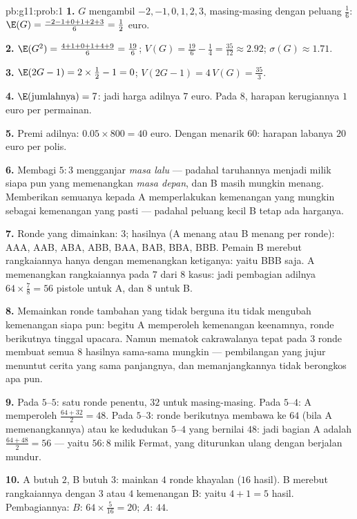 \begin{solution}{pb:g11:prob:1}
\textbf{1.} $G$ mengambil $-2, -1, 0, 1, 2, 3$, masing-masing dengan
peluang $\frac16$: $\E(G) = \frac{-2 - 1 + 0 + 1 + 2 +
3}{6} = \frac12$ euro.

\textbf{2.} $\E(G^2) = \frac{4 + 1 + 0 + 1 + 4 + 9}{6} =
\frac{19}{6}$; $V(G) = \frac{19}{6} - \frac14 = \frac{35}{12}
\approx 2.92$; $\sigma(G) \approx 1.71$.

\textbf{3.} $\E(2G - 1) = 2 \times \frac12 - 1 = 0$;
$V(2G - 1) = 4\,V(G) = \frac{35}{3}$.

\textbf{4.} $\E(\text{jumlahnya}) = 7$: jadi harga adilnya $7$ euro. Pada $8$,
harapan kerugiannya $1$ euro per permainan.

\textbf{5.} Premi adilnya: $0.05 \times 800 = 40$ euro.
Dengan menarik $60$: harapan labanya $20$ euro per polis.

\textbf{6.} Membagi $5:3$ mengganjar \emph{masa lalu} --- padahal
taruhannya menjadi milik siapa pun yang memenangkan \emph{masa depan}, dan B
masih mungkin menang. Memberikan semuanya kepada A memperlakukan kemenangan
yang mungkin sebagai kemenangan yang pasti --- padahal peluang kecil B tetap
ada harganya.

\textbf{7.} Ronde yang dimainkan: $3$; hasilnya (A menang atau B menang per
ronde): AAA, AAB, ABA, ABB, BAA, BAB, BBA, BBB. Pemain B merebut
rangkaiannya hanya dengan memenangkan ketiganya: yaitu BBB saja. A memenangkan
rangkaiannya pada $7$ dari $8$ kasus: jadi pembagian adilnya
$64 \times \frac78 = 56$ pistole untuk A, dan $8$ untuk B.

\textbf{8.} Memainkan ronde tambahan yang tidak berguna itu tidak mengubah
kemenangan siapa pun: begitu A memperoleh kemenangan keenamnya, ronde
berikutnya tinggal upacara. Namun mematok cakrawalanya tepat pada $3$ ronde
membuat semua $8$ hasilnya sama-sama mungkin --- pembilangan yang jujur menuntut
cerita yang sama panjangnya, dan memanjangkannya tidak berongkos apa pun.

\textbf{9.} Pada $5$--$5$: satu ronde penentu, $32$ untuk masing-masing. Pada
$5$--$4$: A memperoleh $\frac{64 + 32}{2} = 48$. Pada $5$--$3$: ronde
berikutnya membawa ke $64$ (bila A memenangkannya) atau ke kedudukan $5$--$4$
yang bernilai $48$: jadi bagian A adalah $\frac{64 + 48}{2} = 56$ ---
yaitu $56 : 8$ milik Fermat, yang diturunkan ulang dengan berjalan mundur.

\textbf{10.} A butuh $2$, B butuh $3$: mainkan $4$ ronde
khayalan ($16$ hasil). B merebut rangkaiannya dengan $3$ atau $4$
kemenangan B: yaitu $4 + 1 = 5$ hasil. Pembagiannya:
$B$: $64 \times \frac{5}{16} = 20$; $A$: $44$.


\end{solution}
